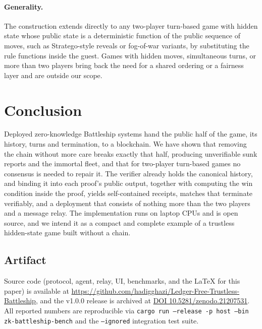 \documentclass[11pt,a4paper]{article}
\newcommand{\code}[1]{\texttt{\small #1}}
\begin{document}
\paragraph{Generality.} The construction extends directly to any two-player
turn-based game with hidden state whose public state is a deterministic function
of the public sequence of moves, such as Stratego-style reveals or fog-of-war
variants, by substituting the rule functions inside the guest. Games with
hidden moves, simultaneous turns, or more than two players bring back the need
for a shared ordering or a fairness layer and are outside our scope.

\section{Conclusion}
\label{sec:conclusion}

Deployed zero-knowledge Battleship systems hand the public half of the game,
its history, turns and termination, to a blockchain. We have shown that removing
the chain without more care breaks exactly that half, producing unverifiable
sunk reports and the immortal fleet, and that for two-player turn-based games no
consensus is needed to repair it. The verifier already holds the canonical
history, and binding it into each proof's public output, together with computing
the win condition inside the proof, yields self-contained receipts, matches that
terminate verifiably, and a deployment that consists of nothing more than the
two players and a message relay. The implementation runs on laptop CPUs and is
open source, and we intend it as a compact and complete example of a trustless
hidden-state game built without a chain.

\subsection*{Artifact}

Source code (protocol, agent, relay, UI, benchmarks, and the LaTeX for this
paper) is available at
\url{https://github.com/hadigghazi/Ledger-Free-Trustless-Battleship}, and the
v1.0.0 release is archived at
\href{https://doi.org/10.5281/zenodo.21207531}{DOI 10.5281/zenodo.21207531}.
All reported numbers are reproducible via
\code{cargo run --release -p host --bin zk-battleship-bench}
and the \code{--ignored} integration test suite.
\end{document}
